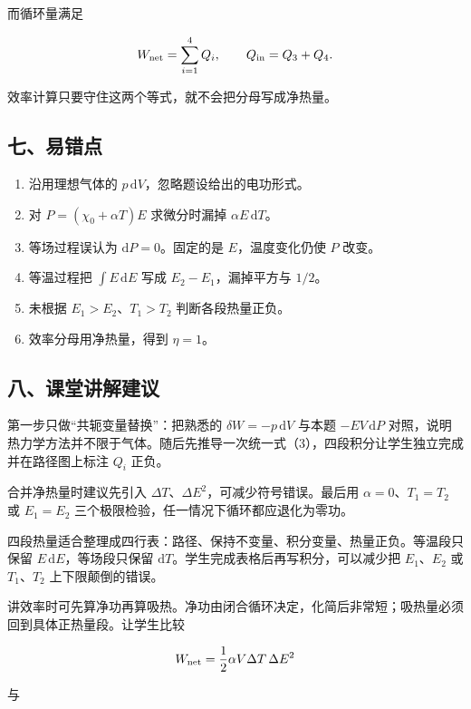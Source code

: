 \documentclass[12pt,a4paper,UTF8]{ctexart}
\newcommand{\tightlist}{\setlength{\itemsep}{0pt}\setlength{\parskip}{0pt}}
\begin{document}
而循环量满足

\[W_{\rm net}=\sum_{i=1}^4Q_i,
\qquad
Q_{\rm in}=Q_3+Q_4.\]

效率计算只要守住这两个等式，就不会把分母写成净热量。

\subsection{七、易错点}\label{ux4e03ux6613ux9519ux70b9-5}

\begin{enumerate}
\def\labelenumi{\arabic{enumi}.}
\tightlist
\item
  沿用理想气体的 \(p\,\mathrm dV\)，忽略题设给出的电功形式。
\item
  对 \(P=(\chi_0+\alpha T)E\) 求微分时漏掉 \(\alpha E\,\mathrm dT\)。
\item
  等场过程误认为 \(\mathrm dP=0\)。固定的是 \(E\)，温度变化仍使 \(P\)
  改变。
\item
  等温过程把 \(\int E\,\mathrm dE\) 写成 \(E_2-E_1\)，漏掉平方与
  \(1/2\)。
\item
  未根据 \(E_1>E_2\)、\(T_1>T_2\) 判断各段热量正负。
\item
  效率分母用净热量，得到 \(\eta=1\)。
\end{enumerate}

\subsection{八、课堂讲解建议}\label{ux516bux8bfeux5802ux8bb2ux89e3ux5efaux8bae-5}

第一步只做``共轭变量替换''：把熟悉的 \(\delta W=-p\,\mathrm dV\) 与本题
\(-EV\,\mathrm dP\)
对照，说明热力学方法并不限于气体。随后先推导一次统一式（3），四段积分让学生独立完成并在路径图上标注
\(Q_i\) 正负。

合并净热量时建议先引入
\(\Delta T\)、\(\Delta E^2\)，可减少符号错误。最后用
\(\alpha=0\)、\(T_1=T_2\) 或 \(E_1=E_2\)
三个极限检验，任一情况下循环都应退化为零功。

四段热量适合整理成四行表：路径、保持不变量、积分变量、热量正负。等温段只保留
\(E\,\mathrm dE\)，等场段只保留
\(\mathrm dT\)。学生完成表格后再写积分，可以减少把 \(E_1\)、\(E_2\) 或
\(T_1\)、\(T_2\) 上下限颠倒的错误。

讲效率时可先算净功再算吸热。净功由闭合循环决定，化简后非常短；吸热量必须回到具体正热量段。让学生比较

\[W_{\rm net}=\frac12\alpha V\Delta T\,\Delta E^2\]

与
\end{document}
